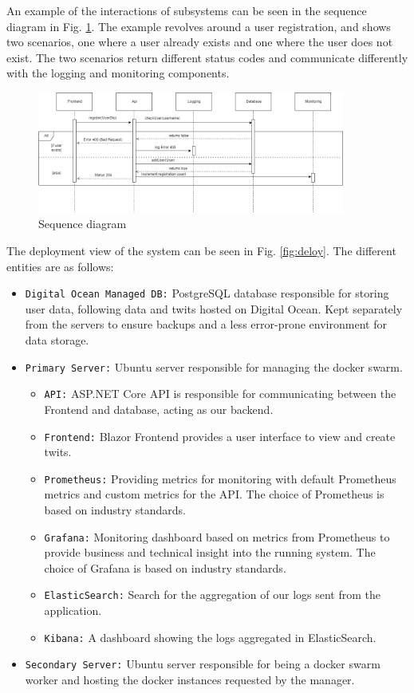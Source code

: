\documentclass[10pt]{article}
\begin{document}
An example of the interactions of subsystems can be seen in the sequence diagram in Fig. \ref{fig:sequence}. The example revolves around a user registration, and shows two scenarios, one where a user already exists and one where the user does not exist. The two scenarios return different status codes and communicate differently with the logging and monitoring components.

\begin{figure} [H]
  \centering
  \includegraphics[width=0.9\textwidth]{images/devops-sequence.png}
  \caption{Sequence diagram}
  \label{fig:sequence}
\end{figure}

The deployment view of the system can be seen in Fig. \ref{fig:deloy}. The different entities are as follows:

\begin{itemize}
    \item \texttt{Digital Ocean Managed DB:} PostgreSQL database responsible for storing user data, following data and twits hosted on Digital Ocean. Kept separately from the servers to ensure backups and a less error-prone environment for data storage.
    \item \texttt{Primary Server:} Ubuntu server responsible for managing the docker swarm.
    \begin{itemize}
        \item \texttt{API:} ASP.NET Core API is responsible for communicating between the Frontend and database, acting as our backend.
        \item \texttt{Frontend:} Blazor Frontend provides a user interface to view and create twits.
        \item \texttt{Prometheus:} Providing metrics for monitoring with default Prometheus metrics and custom metrics for the API. The choice of Prometheus is based on industry standards.
        \item \texttt{Grafana:} Monitoring dashboard based on metrics from Prometheus to provide business and technical insight into the running system. The choice of Grafana is based on industry standards.
        \item \texttt{ElasticSearch:} Search for the aggregation of our logs sent from the application. 
        \item \texttt{Kibana:} A dashboard showing the logs aggregated in ElasticSearch.
    \end{itemize}
    \item \texttt{Secondary Server:} Ubuntu server responsible for being a docker swarm worker and hosting the docker instances requested by the manager.
\end{itemize}
\end{document}
